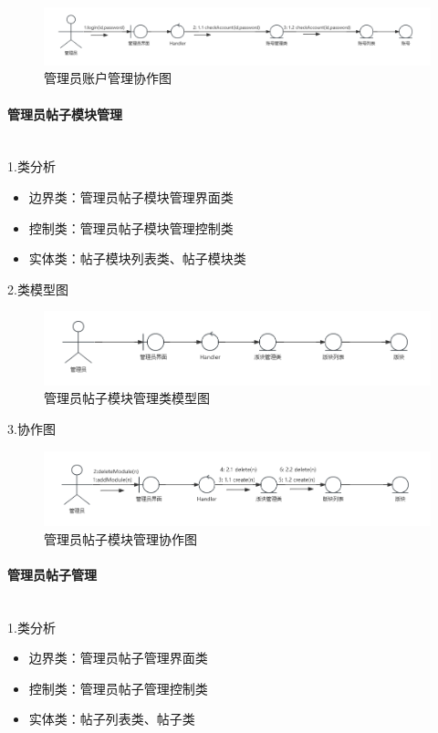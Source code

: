 \documentclass[UTF8]{ctexart}
\newcommand{\subsubsubsection}[1]{\paragraph{#1}\mbox{}\\} %
\begin{document}
\begin{figure}[H]
  \centering
  \includegraphics[scale=0.3]{协作图/管理员账号.png}
  \caption{管理员账户管理协作图}
\end{figure}


\subsubsubsection{管理员帖子模块管理}

1.类分析
\begin{itemize}
  \item 边界类：管理员帖子模块管理界面类
  \item 控制类：管理员帖子模块管理控制类
  \item 实体类：帖子模块列表类、帖子模块类
\end{itemize}

2.类模型图

\begin{figure}[H]
  \centering
  \includegraphics[scale=0.3]{类图/管理员版块管理.png}
  \caption{管理员帖子模块管理类模型图}
\end{figure}

3.协作图

\begin{figure}[H]
  \centering
  \includegraphics[scale=0.3]{协作图/管理版块.png}
  \caption{管理员帖子模块管理协作图}
\end{figure}

\subsubsubsection{管理员帖子管理}

1.类分析
\begin{itemize}
  \item 边界类：管理员帖子管理界面类
  \item 控制类：管理员帖子管理控制类
  \item 实体类：帖子列表类、帖子类
\end{itemize}
\end{document}
